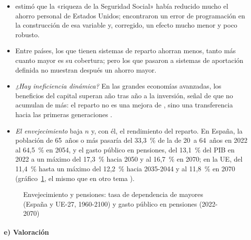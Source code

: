 \documentclass[11pt]{article}
\begin{document}
\begin{itemize}
\item \textcite{Feldstein1974Social} estimó que la «riqueza de la Seguridad Social» había reducido mucho el ahorro personal de Estados Unidos; \textcite{LeimerLesnoy1982Social} encontraron un error de programación en la construcción de esa variable y, corregido, un efecto mucho menor y poco robusto.
\item Entre países, los que tienen sistemas de reparto ahorran menos, tanto más cuanto mayor es su cobertura; pero los que pasaron a sistemas de aportación definida no muestran después un ahorro mayor\nocite{Samwick2000Pension}.
\item \emph{¿Hay ineficiencia dinámica?} En las grandes economías avanzadas, los beneficios del capital superan año tras año a la inversión, señal de que no acumulan de más\nocite{AbelEtAl1989Assessing}: el reparto no es una mejora de , sino una transferencia hacia las primeras generaciones .
\item \emph{El envejecimiento} baja $n$ y, con él, el rendimiento del reparto. En España, la población de 65~años o más pasaría del 33,3~\% de la de 20~a 64~años en 2022 al 64,5~\% en 2054, y el gasto público en pensiones, del 13,1~\% del PIB en 2022 a un máximo del 17,3~\% hacia 2050 y al 16,7~\% en 2070; en la UE, del 11,4~\% hasta un máximo del 12,2~\% hacia 2035-2044 y al 11,8~\% en 2070\nocite{CE2024AgeingReport,CE2024AgeingReportAnexo} (gráfico~\ref{fig:demografia-pensiones}, el mismo que en otro tema ).
\end{itemize}

\begin{figure}[H]
\centering
\caption{Envejecimiento y pensiones: tasa de dependencia de mayores (España y UE-27, 1960-2100) y gasto público en pensiones (2022-2070)}\label{fig:demografia-pensiones}
\end{figure}

\paragraph{e) Valoración}
\end{document}

